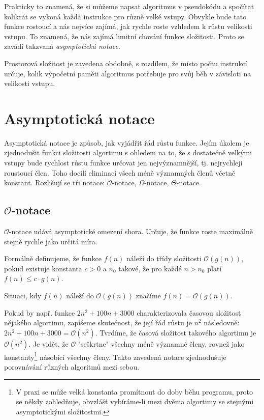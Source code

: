 \documentclass[12pt]{report}			%
\begin{document}
			
			Prakticky to znamená, že si můžeme napsat algoritmus v pseudokódu a spočítat kolikrát se vykoná každá instrukce pro různě velké vstupy. Obvykle bude tato funkce rostoucí a nás nejvíce zajímá, jak rychle roste vzhledem k růstu velikosti vstupu. To znamená, že nás zajímá limitní chování funkce složitosti. Proto se zavádí takzvaná \emph{asymptotická notace}.
			
			Prostorová složitost je zavedena obdobně, s rozdílem, že místo počtu instrukcí určuje, kolik výpočetní paměti algoritmus potřebuje pro svůj běh v závisloti na velikosti vstupu. \cite{pruvodce}
			\section{Asymptotická notace}
			Asymptotická notace je způsob, jak vyjádřit řád růstu funkce. Jejím úkolem je zjednodušit funkci složitosti algortimu s ohledem na to, že s dostatečně velkými vstupy bude rychlost růstu funkce určovat jen nejvýznamnější, tj. nejrychleji roustoucí člen. Toho docílí eliminací všech méně významných členů včetně konstant. Rozlišují se tři notace: $\mathcal{O}$-notace, $\Omega$-notace, $\Theta$-notace. \cite{intro}
			
			\subsection{$\mathcal{O}$-notace}
			
			$\mathcal{O}$-notace udává asymptotické omezení shora. Určuje, že funkce roste maximálně stejně rychle jako určitá míra.
			
			Formálně definujeme, že funkce $f(n)$ náleží do třídy složitosti $\mathcal{O}(g(n))$, pokud existuje konstanta $c > 0$ a $n_0$ takové, že pro každé $n>n_0$ platí $f(n) \leq c \cdot g(n)$.
			
			Situaci, kdy $f(n)$ náleží do $\mathcal{O}(g(n))$ značíme $f(n) = \mathcal{O}(g(n))$.
			
			Pokud by např. funkce $2n^2+100n+3000$ charakterizovala časovou složitost nějakého algortimu, zapíšeme skutečnost, že její řád růstu je $n^2$ následovně: $2n^2+100n+3000 = \mathcal{O}(n^2)$. Tvrdíme, že časová složitost takového algortimu je $\mathcal{O}(n^2)$. Je vidět, že $\mathcal{O}$ "seškrtne" všechny méně významné členy, rovnež jako konstanty\footnote{V praxi se může velká konstanta promítnout do doby běhu programu, proto se někdy zohledňuje, obvzlášť vybíráme-li mezi dvěma algortimy se stejnými asymptotickými složitostmi.} násobící všechny členy. Takto zavedená notace zjednodušuje porovnávání různých algoritmů mezi sebou.
			
\end{document}
